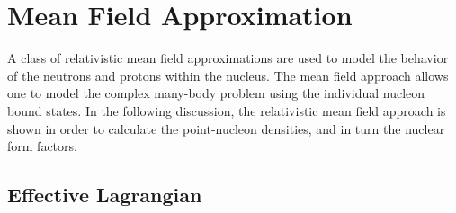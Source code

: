 \section{Mean Field Approximation}

A class of relativistic mean field approximations are used to model the behavior of the neutrons and protons within the nucleus. The mean field approach allows one to model the complex many-body problem using the individual nucleon bound states. In the following discussion, the relativistic mean field approach is shown in order to calculate the point-nucleon densities, and in turn the nuclear form factors. 

\subsection{Effective Lagrangian}

